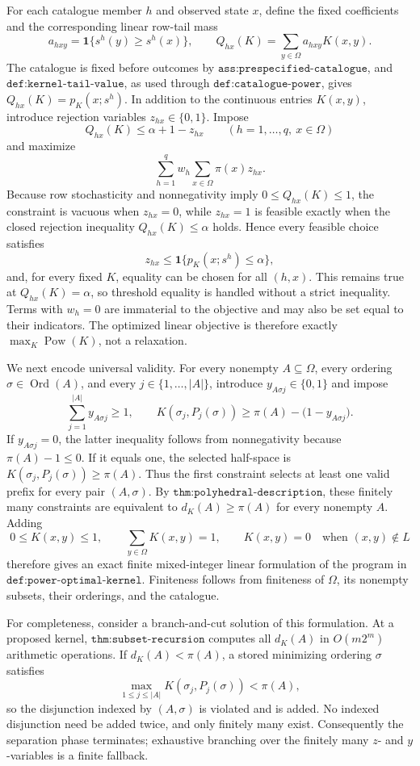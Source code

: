 For each catalogue member \(h\) and observed state \(x\), define the fixed coefficients and the corresponding linear row-tail mass
\[
 a_{hxy}=\mathbf 1\{s^h(y)\geq s^h(x)\},
 \qquad
 Q_{hx}(K)=\sum_{y\in\Omega}a_{hxy}K(x,y).
\]
The catalogue is fixed before outcomes by \(\texttt{ass:prespecified-catalogue}\), and \(\texttt{def:kernel-tail-value}\), as used through \(\texttt{def:catalogue-power}\), gives \(Q_{hx}(K)=p_K(x;s^h)\).  In addition to the continuous entries \(K(x,y)\), introduce rejection variables \(z_{hx}\in\{0,1\}\).  Impose
\[
 Q_{hx}(K)\leq \alpha+1-z_{hx}
 \qquad(h=1,\ldots,q,\ x\in\Omega)
\]
and maximize
\[
 \sum_{h=1}^{q}w_h\sum_{x\in\Omega}\pi(x)z_{hx}.
\]
Because row stochasticity and nonnegativity imply \(0\leq Q_{hx}(K)\leq1\), the constraint is vacuous when \(z_{hx}=0\), while \(z_{hx}=1\) is feasible exactly when the closed rejection inequality \(Q_{hx}(K)\leq\alpha\) holds.  Hence every feasible choice satisfies
\[
 z_{hx}\leq\mathbf 1\{p_K(x;s^h)\leq\alpha\},
\]
and, for every fixed \(K\), equality can be chosen for all \((h,x)\).  This remains true at \(Q_{hx}(K)=\alpha\), so threshold equality is handled without a strict inequality.  Terms with \(w_h=0\) are immaterial to the objective and may also be set equal to their indicators.  The optimized linear objective is therefore exactly \(\max_K\operatorname{Pow}(K)\), not a relaxation.

We next encode universal validity.  For every nonempty \(A\subseteq\Omega\), every ordering \(\sigma\in\operatorname{Ord}(A)\), and every \(j\in\{1,\ldots,|A|\}\), introduce \(y_{A\sigma j}\in\{0,1\}\) and impose
\[
 \sum_{j=1}^{|A|}y_{A\sigma j}\geq1,
 \qquad
 K(\sigma_j,P_j(\sigma))
 \geq \pi(A)-\bigl(1-y_{A\sigma j}\bigr).
\]
If \(y_{A\sigma j}=0\), the latter inequality follows from nonnegativity because \(\pi(A)-1\leq0\).  If it equals one, the selected half-space is
\(K(\sigma_j,P_j(\sigma))\geq\pi(A)\).  Thus the first constraint selects at least one valid prefix for every pair \((A,\sigma)\).  By \(\texttt{thm:polyhedral-description}\), these finitely many constraints are equivalent to \(d_K(A)\geq\pi(A)\) for every nonempty \(A\).  Adding
\[
 0\leq K(x,y)\leq1,
 \qquad
 \sum_{y\in\Omega}K(x,y)=1,
 \qquad
 K(x,y)=0\quad\text{when }(x,y)\notin L
\]
therefore gives an exact finite mixed-integer linear formulation of the program in \(\texttt{def:power-optimal-kernel}\).  Finiteness follows from finiteness of \(\Omega\), its nonempty subsets, their orderings, and the catalogue.

For completeness, consider a branch-and-cut solution of this formulation.  At a proposed kernel, \(\texttt{thm:subset-recursion}\) computes all \(d_K(A)\) in \(O(m2^m)\) arithmetic operations.  If \(d_K(A)<\pi(A)\), a stored minimizing ordering \(\sigma\) satisfies
\[
 \max_{1\leq j\leq|A|}K(\sigma_j,P_j(\sigma))<\pi(A),
\]
so the disjunction indexed by \((A,\sigma)\) is violated and is added.  No indexed disjunction need be added twice, and only finitely many exist.  Consequently the separation phase terminates; exhaustive branching over the finitely many \(z\)- and \(y\)-variables is a finite fallback.

